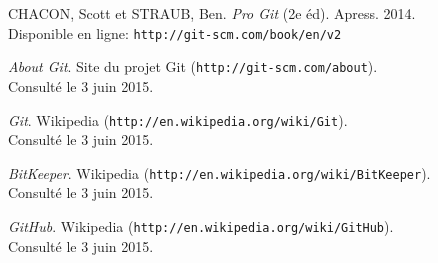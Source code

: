 \documentclass[11pt,a4paper]{article}
\begin{document}
\pagebreak
\begin{thebibliography}{1}

	CHACON, Scott et STRAUB, Ben. {\em Pro Git} (2e éd). Apress. 2014. \\
	Disponible en ligne: {\tt http://git-scm.com/book/en/v2}

	{\em About Git}. Site du projet Git ({\tt http://git-scm.com/about}). \\
	Consulté le 3 juin 2015.

	{\em Git}. Wikipedia ({\tt http://en.wikipedia.org/wiki/Git}). \\
	Consulté le 3 juin 2015.

	{\em BitKeeper}. Wikipedia ({\tt http://en.wikipedia.org/wiki/BitKeeper}). \\
	Consulté le 3 juin 2015.

	{\em GitHub}. Wikipedia ({\tt http://en.wikipedia.org/wiki/GitHub}). \\
	Consulté le 3 juin 2015.
	
\end{thebibliography}
\end{document}
